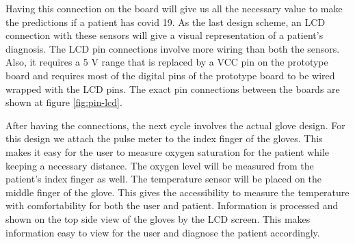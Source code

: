 \documentclass[10pt, conference]{IEEEtran}
\begin{document}
Having this connection on the board  will give us all the necessary value to make the predictions if a patient has covid 19. As the last design scheme, an LCD connection with these sensors will give a visual representation of a patient's diagnosis. The LCD pin connections involve more wiring than both the sensors. Also, it  requires a 5 V range that is replaced by a VCC pin on the prototype board and requires most of the digital pins of the prototype board to be wired wrapped with the LCD pins. The exact pin connections between the boards are shown at figure \ref{fig:pin-lcd}.

After having the connections, the next cycle involves the actual glove design. For this design we attach the pulse meter to the index finger of the gloves. This makes it easy for the user to measure oxygen saturation for the patient while keeping a necessary distance. The oxygen level will be measured from the patient's index finger as well. The temperature sensor will be placed on the middle finger of the glove. This gives the accessibility to measure the temperature with comfortability for both the user and patient. Information is processed and shown on the top side view of the gloves by the LCD screen. This makes information easy to view for the user and diagnose the patient accordingly. 






\end{document}
